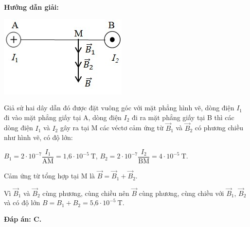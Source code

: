 {\begin{center}
		\textbf{Hướng dẫn giải:}
\end{center}
	\begin{center}
		\includegraphics[scale=0.8]{../figs/VN11-PH-26-L-018-1-h84.jpg}
	\end{center}
Giả sử hai dây dẫn đó được đặt vuông góc với mặt phẳng hình vẽ, dòng điện $I_1$  đi vào mặt phẳng giấy tại A, dòng điện $I_2$ đi ra mặt phẳng giấy tại B thì các dòng điện $I_1$   và $I_2$ gây ra tại M các véctơ cảm ứng từ $\vec{B}_1$ và $\vec{B}_2$ có phương chiều như hình vẽ, có độ lớn:

$B_1=2\cdot 10^{-7}\dfrac{I_1}{\text{AM}}=\text{1,6}\cdot 10^{-5}\ \text{T}$, $B_2=2\cdot 10^{-7}\dfrac{I_2}{\text{BM}}=\text{4}\cdot 10^{-5}\ \text{T}$.

Cảm ứng từ tổng hợp tại M là $\vec{B}=\vec{B}_1+\vec{B}_2$.

Vì $\vec{B}_1$ và $\vec{B}_2$ cùng phương, cùng chiều nên $\vec{B}$ cùng phương, cùng chiều với $\vec{B}_1$, $\vec{B}_2$ và có độ lớn $B=B_1+B_2=\text{5,6}\cdot 10^{-5}\ \text{T}$.  

\textbf{	Đáp án: C.}
}

